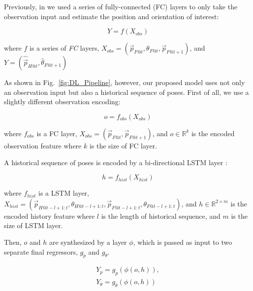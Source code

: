 \documentclass[letterpaper, 10 pt, conference]{ieeeconf}  %
\begin{document}
	Previously, in \cite{CPR17} we used a series of fully-connected (FC) layers 
	to only take the observation input and estimate the position and orientation 
	of interest: 
	
	\begin{equation}
	Y = f(X_{obs})
	\end{equation}
	
	\begin{flushleft}
	where $f$ is a series of \emph{FC} layers, 
	$X_{obs} = (\vec{p}_{F@t}, \theta_{F@t}, \vec{p}_{F@t+1})$, and
	$Y = (\hat{\vec{p}}_{H@t}, \hat{\theta}_{F@t+1})$
	\end{flushleft}
	
	As shown in Fig.~\ref{fig:DL_Pipeline}, however, our proposed model uses not only 
	an observation input but also a historical sequence of poses. First of all, we 
	use a slightly different observation encoding: 

	\begin{equation}
	o = f_{obs}(X_{obs})
	\end{equation}

	where $f_{obs}$ is a FC layer,
		$X_{obs} = (\vec{p}_{F@t}, \vec{p}_{F@t+1})$, 
		and $o \in \mathbb{R}^{k}$ is the encoded observation feature 
		where $k$ is the size of FC layer. 
		
	A historical sequence of poses is encoded by a bi-directional LSTM layer \cite{Wu16}: 

	\begin{equation}
	h = f_{hist}(X_{hist})
	\end{equation}


     where $f_{hist}$ is a LSTM layer,	
		$X_{hist} = (\vec{p}_{H@t-l+1:t}, \theta_{H@t-l+1:t},
		             \vec{p}_{F@t-l+1:t}, \theta_{F@t-l+1:t})$,		
		and $h \in \mathbb{R}^{2 \times m}$ is the encoded history feature
	where $l$ is the length of historical sequence, 
	and $m$ is the size of LSTM layer. 

	Then, $o$ and $h$ are synthesized by a layer $\phi$, which is 
	passed as input to two separate final regressors, $g_{p}$ and $g_\theta$.  
	
	\begin{equation}
	\begin{split}
	Y_{p} = g_{p}(\phi(o, h)),\\
	Y_{\theta}= g_{\theta}(\phi(o, h)) 
	\end{split}
	\label{eq:regression_output}
	\end{equation}
	
\end{document}
